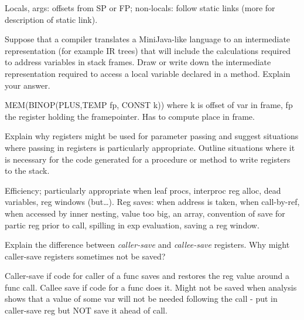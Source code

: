 \documentclass[11pt]{bareexam}
\begin{document}
\begin{questions}
\begin{subquestions}
\begin{modelanswer}
Locals, args: offsets from SP or FP; non-locals: follow static links
(more for description of static link).
\end{modelanswer}

\subsubquestion
Suppose  that a compiler translates a MiniJava-like language
to an intermediate representation (for example IR trees) 
that will include 
the calculations required to address variables in stack frames.
Draw or write down
the intermediate representation
required to access a local variable declared in a method.
Explain your answer.

\begin{modelanswer}
MEM(BINOP(PLUS,TEMP fp, CONST k)) where k is offset of var in frame, fp the
register holding the framepointer. Has to compute place in frame.
\end{modelanswer}


\subquestion
Explain why registers might be used for parameter passing and
suggest situations where passing in registers is particularly
appropriate. 
Outline situations where it is necessary for the code generated for a 
procedure or method to write registers to the stack.

\begin{modelanswer}
Efficiency; particularly appropriate when leaf procs, interproc
reg alloc, dead variables, reg windows (but\ldots).
Reg saves: when address is taken,
when call-by-ref,
when accessed by inner nesting,
value too big,
an array,
convention of save for partic reg prior to call,
spilling in exp evaluation,
saving a reg window.
\end{modelanswer}

\subquestion
Explain the difference between \emph{caller-save\/} and \emph{callee-save\/}
registers. Why might caller-save registers sometimes not be saved?

\begin{modelanswer}
Caller-save if code for caller of a func saves and restores the reg value
around a func call. Callee save if code for a func does it. Might not be
saved when analysis shows that a value of some var will not be needed following
the call - put in caller-save reg but NOT save it ahead of call.
\end{modelanswer}

\end{subquestions}

\newpage

\question


\end{questions}
\end{document}
